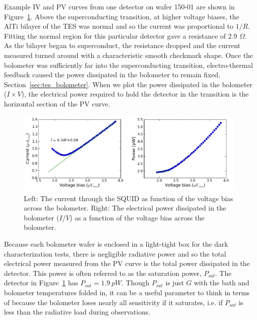Example IV and PV curves from one detector on wafer 150-01 are shown in Figure~\ref{fig:bolo_iv_curve}.
Above the superconducting transition, at higher voltage biases, the AlTi bilayer of the \ac{TES} was normal and so the current was proportional to $1 / R$. 
Fitting the normal region for this particular detector gave a resistance of 2.9 $\Omega$. 
As the bilayer began to superconduct, the resistance dropped and the current measured turned around with a characteristic smooth checkmark shape. 
Once the bolometer was sufficiently far into the superconducting transition, electro-thermal feedback caused the power dissipated in the bolometer to remain fixed, Section~\ref{sec:tes_bolometer}.
When we plot the power dissipated in the bolometer ($I \times V$), the electrical power required to hold the detector in the transition is the horizontal section of the PV curve.

\begin{figure}[htbp]
\begin{center}
\includegraphics[width=0.99\columnwidth]{figures/IV_201007301208.png} 
\caption{Left: The current through the \ac{SQUID} as function of the voltage bias across the bolometer. Right: The electrical power dissipated in the bolometer ($I / V$) as a function of the voltage bias across the bolometer.
\label{fig:bolo_iv_curve} }
\end{center}
\end{figure}


Because each bolometer wafer is enclosed in a light-tight box for the dark characterization tests, there is negligible radiative power and so the total electrical power measured from the PV curve is the total power dissipated in the detector. 
This power is often referred to as the saturation power, $P_{sat}$. 
The detector in Figure~\ref{fig:bolo_iv_curve} has $P_{sat} = 1.9~pW$.
Though $P_{sat}$ is just $G$ with the bath and bolometer temperatures folded in, it can be a useful parameter to think in terms of because the bolometer loses nearly all sensitivity if it saturates, i.e. if $P_{sat}$ is less than the radiative load during observations. 

